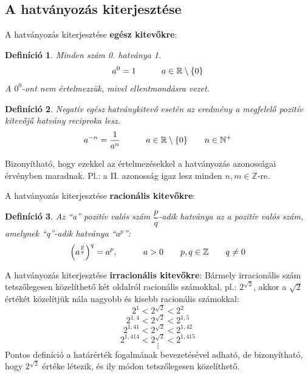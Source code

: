 \documentclass[12pt,a4paper]{article}
\newtheorem{definition}{Definíció} [section]
\begin{document}
\subsection{A hatványozás kiterjesztése}
A hatványozás kiterjesztése \textbf{egész kitevőkre}:
\begin{definition}
Minden szám 0. hatványa 1. \\
$$a^0 = 1 \hspace{30px} a \in \mathbb{R}\setminus \lbrace 0\rbrace$$
A $0^0$-ont nem értelmezzük, mivel ellentmondásra vezet. 
\end{definition}

\begin{definition}
Negatív egész hatványkitevő esetén az eredmény a megfelelő pozitív kitevőjű hatvány reciproka lesz. \\
$$a^{-n} = \dfrac{1}{a^n} \hspace{30px} a \in \mathbb{R}\setminus \lbrace 0\rbrace \hspace{20px} n \in \mathbb{N}^+ $$
\end{definition}


Bizonyítható, hogy ezekkel az értelmezésekkel a hatványozás azonosságai érvényben maradnak.
Pl.: a II. azonosság igaz lesz minden $n,m\in \mathbb{Z}$-re.

\vspace{50px}
A hatványozás kiterjesztése \textbf{racionális kitevőkre}:
\begin{definition}
Az ``a'' pozitív valós szám $\dfrac{p}{q}$-adik hatványa az a pozitív valós szám, amelynek ``q''-adik hatványa ``$a^p$'':
$$\left(a^{\frac{p}{q}}\right)^q=a^p, \hspace{30px}a>0\hspace{20px} p,q\in \mathbb{Z} \hspace{20px}q\neq 0$$
\end{definition}

\vspace{50px}
A hatványozás kiterjesztése \textbf{irracionális kitevőkre}:
Bármely irracionális szám tetszőlegesen közelíthető két oldalról racionális számokkal, pl.: $2^{\sqrt{2}}$, akkor a $\sqrt{2}$ értékét közelítjük nála nagyobb és kisebb racionális számokkal:
\[ 2^1 < 2^{\sqrt{2}} < 2^2  \]
\[2^{1,4} < 2^{\sqrt{2}} < 2^{1,5}\]
\[2^{1,41} < 2^{\sqrt{2}} < 2^{1,42}\]
\[2^{1,414} < 2^{\sqrt{2}} < 2^{1,415}\]
$$\vdots$$
Pontos definíció a határérték fogalmának bevezetésével adható, de bizonyítható, hogy $2^{\sqrt{2}}$ értéke létezik, és ily módon tetszőlegesen közelíthető.
\end{document}
